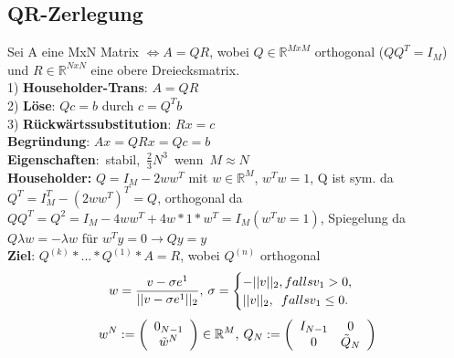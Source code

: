 \subsection{QR-Zerlegung}
Sei A eine MxN Matrix $\Leftrightarrow A = QR$, wobei $Q \in \mathbb{R}^{MxM}$ orthogonal ($QQ^T = I_M$) und  $R \in \mathbb{R}^{NxN}$ eine obere Dreiecksmatrix.\\
1) \textbf{Householder-Trans}: $A = QR$\\
2) \textbf{Löse}: $Qc = b$ durch $c = Q^Tb$\\
3) \textbf{Rückwärtssubstitution}: $Rx = c$\\
\textbf{Begründung}: $Ax = QRx = Qc = b$\\
\mbox{\textbf{Eigenschaften}: stabil, $\frac{2}{3}N^3$ wenn $M \approx N$}\\
\textbf{Householder:} $Q = I_M - 2ww^T$ mit $w \in \mathbb{R}^M$, $w^Tw = 1$,
Q ist sym. da $Q^T = I_M^T - (2ww^T)^T = Q$,
orthogonal da $QQ^T = Q^2 = I_M -4ww^T + 4w * 1 * w^T = I_M (w^Tw = 1)$, Spiegelung da $Q\lambda w = -\lambda w$ für $w^Ty = 0 \rightarrow Qy = y$\\
\textbf{Ziel}: $Q^{(k)}*...*Q^{(1)}*A = R$, wobei $Q^{(n)}$ orthogonal\\
\[w = \frac{v - \sigma e^1}{||v - \sigma e^1||_2}, \hspace{0.2em} \sigma = 
\begin{cases}
-||v||_2, falls v_1 > 0,\\
||v||_2, \hspace{0.5em} falls v_1 \leq 0. \\
\end{cases}
\]
\[
w^N := \left(\begin{array}{c}
0_{N-1} \\
\tilde{w}^N \\
\end{array}\right) \in \mathbb{R}^M, \hspace{0.2em} Q_N := \left(\begin{array}{cc}
I_{N-1} & 0 \\
0 & \tilde{Q}_N \\
\end{array}\right)
\]


